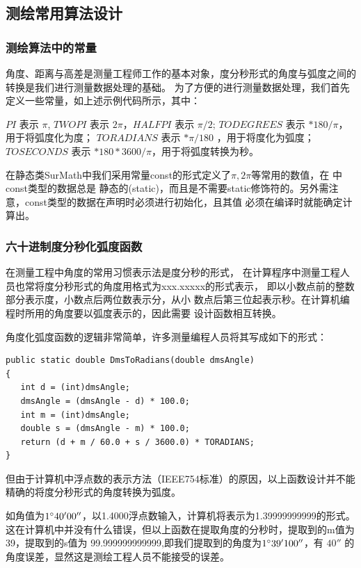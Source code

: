 \subsection{测绘常用算法设计}


\subsubsection{测绘算法中的常量}
角度、距离与高差是测量工程师工作的基本对象，度分秒形式的角度与弧度之间的转换是我们进行测量数据处理的基础。
为了方便的进行测量数据处理，我们首先定义一些常量，如上述示例代码所示，其中：

$PI$ 表示 $\pi$, $TWOPI$ 表示 $2\pi$，$HALFPI$ 表示 $\pi/2$;
$TODEGREES$ 表示 $*180/\pi$，用于将弧度化为度；
$TORADIANS$ 表示 $*\pi/180$ ，用于将度化为弧度；
$TOSECONDS$ 表示 $*180*3600/\pi$，用于将弧度转换为秒。

在静态类SurMath中我们采用常量const的形式定义了$\pi, 2\pi$等常用的数值，在 \cs 中 const类型的数据总是
静态的(static)，而且是不需要static修饰符的。另外需注意，const类型的数据在声明时必须进行初始化，且其值
必须在编译时就能确定计算出。

\subsubsection{六十进制度分秒化弧度函数}

 在测量工程中角度的常用习惯表示法是度分秒的形式，
 在计算程序中测量工程人员也常将度分秒形式的角度用格式为xxx.xxxxx的形式表示，
 即以小数点前的整数部分表示度，小数点后两位数表示分，从小
 数点后第三位起表示秒。在计算机编程时所用的角度要以弧度表示的，因此需要
 设计函数相互转换。

 
角度化弧度函数的逻辑非常简单，许多测量编程人员将其写成如下的形式：

\begin{lstlisting}
public static double DmsToRadians(double dmsAngle)
{
   int d = (int)dmsAngle;
   dmsAngle = (dmsAngle - d) * 100.0;
   int m = (int)dmsAngle;
   double s = (dmsAngle - m) * 100.0;
   return (d + m / 60.0 + s / 3600.0) * TORADIANS;
}
\end{lstlisting}

但由于计算机中浮点数的表示方法（IEEE754标准）的原因，以上函数设计并不能精确的将度分秒形式的角度转换为弧度。

 如角值为$1^\circ 40'00''$，以1.4000浮点数输入，计算机将表示为1.39999999999的形式。
 这在计算机中并没有什么错误，但以上函数在提取角度的分秒时，提取到的m值为39，提取到的s值为
 99.999999999999,即我们提取到的角度为$1^\circ 39'100''$，有 $40''$ 的角度误差，显然这是测绘工程人员不能接受的误差。
 

